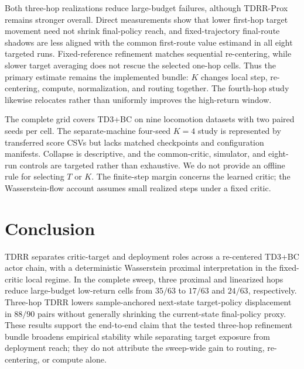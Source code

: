 \documentclass[letterpaper]{article}
\begin{document}
Both three-hop realizations reduce large-budget failures, although TDRR-Prox remains stronger overall. Direct measurements show that lower first-hop target movement need not shrink final-policy reach, and fixed-trajectory final-route shadows are less aligned with the common first-route value estimand in all eight targeted runs. Fixed-reference refinement matches sequential re-centering, while slower target averaging does not rescue the selected one-hop cells. Thus the primary estimate remains the implemented bundle: $K$ changes local step, re-centering, compute, normalization, and routing together. The fourth-hop study likewise relocates rather than uniformly improves the high-return window.

The complete grid covers TD3+BC on nine locomotion datasets with two paired seeds per cell. The separate-machine four-seed $K=4$ study is represented by transferred score CSVs but lacks matched checkpoints and configuration manifests. Collapse is descriptive, and the common-critic, simulator, and eight-run controls are targeted rather than exhaustive. We do not provide an offline rule for selecting $T$ or $K$. The finite-step margin concerns the learned critic; the Wasserstein-flow account assumes small realized steps under a fixed critic.

\section{Conclusion}
\label{sec:conclusion}

TDRR separates critic-target and deployment roles across a re-centered TD3+BC actor chain, with a deterministic Wasserstein proximal interpretation in the fixed-critic local regime. In the complete sweep, three proximal and linearized hops reduce large-budget low-return cells from $35/63$ to $17/63$ and $24/63$, respectively. Three-hop TDRR lowers sample-anchored next-state target-policy displacement in $88/90$ pairs without generally shrinking the current-state final-policy proxy. These results support the end-to-end claim that the tested three-hop refinement bundle broadens empirical stability while separating target exposure from deployment reach; they do not attribute the sweep-wide gain to routing, re-centering, or compute alone.



\end{document}
